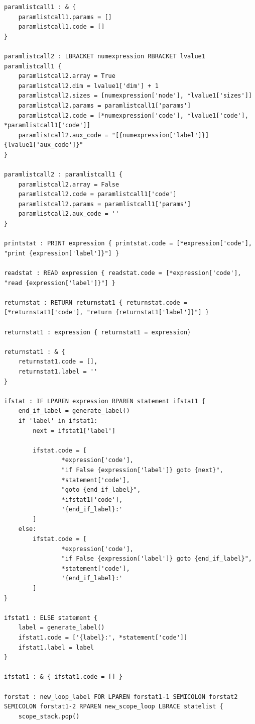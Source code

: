 \documentclass[
	12pt,				%
	openright,			%
	twoside,			%
	a4paper,			%
	english,			%
	french,				%
	spanish,			%
	brazil				%
	]{abntex2}
\begin{document}
\begin{apendicesenv}
\begin{lstlisting}
paramlistcall1 : & {
    paramlistcall1.params = []
    paramlistcall1.code = []
}

paramlistcall2 : LBRACKET numexpression RBRACKET lvalue1 paramlistcall1 {
    paramlistcall2.array = True
    paramlistcall2.dim = lvalue1['dim'] + 1
    paramlistcall2.sizes = [numexpression['node'], *lvalue1['sizes']]
    paramlistcall2.params = paramlistcall1['params']
    paramlistcall2.code = [*numexpression['code'], *lvalue1['code'], *paramlistcall1['code']]
    paramlistcall2.aux_code = "[{numexpression['label']}]{lvalue1['aux_code']}"
}

paramlistcall2 : paramlistcall1 {
    paramlistcall2.array = False
    paramlistcall2.code = paramlistcall1['code']
    paramlistcall2.params = paramlistcall1['params']
    paramlistcall2.aux_code = ''
}

printstat : PRINT expression { printstat.code = [*expression['code'], "print {expression['label']}"] }

readstat : READ expression { readstat.code = [*expression['code'], "read {expression['label']}"] }

returnstat : RETURN returnstat1 { returnstat.code = [*returnstat1['code'], "return {returnstat1['label']}"] }

returnstat1 : expression { returnstat1 = expression}

returnstat1 : & {
    returnstat1.code = [],
    returnstat1.label = ''
}

ifstat : IF LPAREN expression RPAREN statement ifstat1 {
    end_if_label = generate_label()
    if 'label' in ifstat1:
        next = ifstat1['label']

        ifstat.code = [
                *expression['code'],
                "if False {expression['label']} goto {next}",
                *statement['code'],
                "goto {end_if_label}",
                *ifstat1['code'],
                '{end_if_label}:'
        ]
    else:
        ifstat.code = [
                *expression['code'],
                "if False {expression['label']} goto {end_if_label}",
                *statement['code'],
                '{end_if_label}:'
        ]
}

ifstat1 : ELSE statement {
    label = generate_label()
    ifstat1.code = ['{label}:', *statement['code']]
    ifstat1.label = label
}

ifstat1 : & { ifstat1.code = [] }

forstat : new_loop_label FOR LPAREN forstat1-1 SEMICOLON forstat2 SEMICOLON forstat1-2 RPAREN new_scope_loop LBRACE statelist {
    scope_stack.pop()


\end{lstlisting}
\end{apendicesenv}
\end{document}
